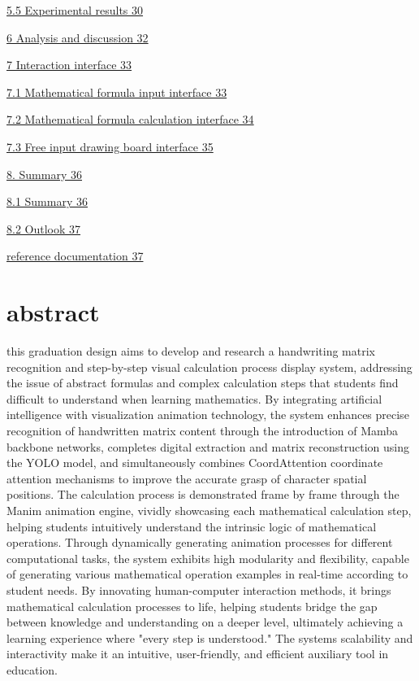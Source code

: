 \documentclass[
]{article}
\begin{document}
\hyperref[experimental-result]{5.5 Experimental results 30}

\hyperref[analysis-and-discussion]{6 Analysis and discussion 32}

\hyperref[interface-for-interaction]{7 Interaction interface 33}

\hyperref[mathematical-formula-input-interface]{7.1 Mathematical formula
input interface 33}

\hyperref[mathematical-formula-calculation-interface]{7.2 Mathematical
formula calculation interface 34}

\hyperref[free-input-board-interface]{7.3 Free input drawing board
interface 35}

\hyperref[sum-up]{8. Summary 36}

\hyperref[sum-up-1]{8.1 Summary 36}

\hyperref[look-into-the-distance]{8.2 Outlook 37}

\hyperref[reference-documentation]{reference documentation 37}

\section{}\label{section}

\section{abstract}\label{abstract}

this graduation design aims to develop and research a handwriting matrix
recognition and step-by-step visual calculation process display system,
addressing the issue of abstract formulas and complex calculation steps
that students find difficult to understand when learning mathematics. By
integrating artificial intelligence with visualization animation
technology, the system enhances precise recognition of handwritten
matrix content through the introduction of Mamba backbone networks,
completes digital extraction and matrix reconstruction using the YOLO
model, and simultaneously combines CoordAttention coordinate attention
mechanisms to improve the accurate grasp of character spatial positions.
The calculation process is demonstrated frame by frame through the Manim
animation engine, vividly showcasing each mathematical calculation step,
helping students intuitively understand the intrinsic logic of
mathematical operations. Through dynamically generating animation
processes for different computational tasks, the system exhibits high
modularity and flexibility, capable of generating various mathematical
operation examples in real-time according to student needs. By
innovating human-computer interaction methods, it brings mathematical
calculation processes to life, helping students bridge the gap between
knowledge and understanding on a deeper level, ultimately achieving a
learning experience where "every step is understood." The
system\textquotesingle s scalability and interactivity make it an
intuitive, user-friendly, and efficient auxiliary tool in education.
\end{document}
